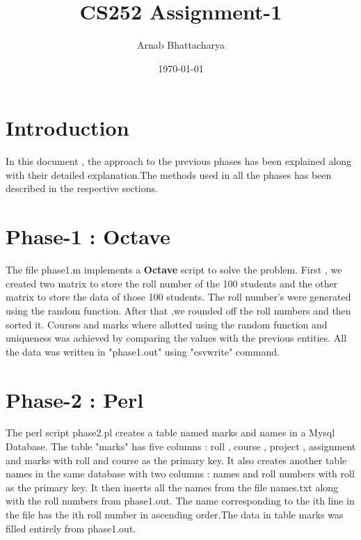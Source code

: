 \documentclass[11pt]{article}
\title{CS252 Assignment-1}
\author{Arnab Bhattacharya}
\date{\today}
\begin{document}
\maketitle

\section {Introduction}
\label{sec:intro}
In this document , the approach to the previous phases has been explained along with their detailed explanation.The methods used in all the phases has been described in the respective sections.

\section{Phase-1 : Octave}
\label{sec:ph1}
The file phase1.m implements a {\bf Octave} script to solve the problem. First , we created two matrix to store the roll number of the 100 students and the other matrix to store the data of those 100 students. The roll number's were generated using the random function. After that ,we rounded off the roll numbers and then sorted it. Courses and marks where allotted using the random function and uniqueness was achieved by comparing the values with the previous entities. All the data was written in "phase1.out" using "csvwrite" command.

\section{Phase-2 : Perl}
\label{sec:ph2}
The perl script phase2.pl creates a table named marks and names in a Mysql Database. The table "marks" has five columns : roll ,  course , project , assignment and marks with roll and course as the primary key. It also creates another table names in the same database with two columns : names and roll numbers
with roll as the primary key. It then inserts all the names from the file names.txt along with the roll numbers from phase1.out.
The name corresponding to the ith line in the file has the ith roll number in ascending order.The data in table marks was filled entirely from phase1.out.
 
\end{document}
